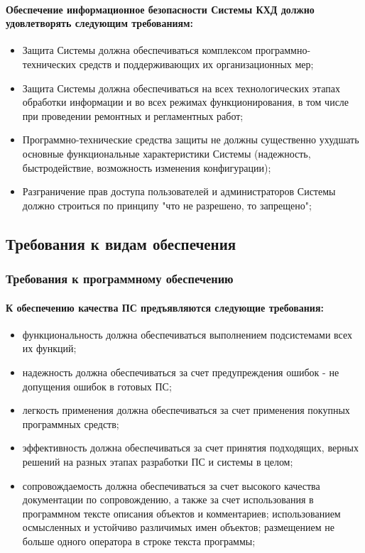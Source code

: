 \documentclass{article}
\begin{document}
            \paragraph{Обеспечение информационное безопасности Системы КХД должно удовлетворять следующим требованиям:}
            \begin{itemize}
                \item Защита Системы должна обеспечиваться комплексом программно-технических средств и поддерживающих их организационных мер;
                \item Защита Системы должна обеспечиваться на всех технологических этапах обработки информации и во всех режимах функционирования, в том числе при проведении ремонтных и регламентных работ;
                \item Программно-технические средства защиты не должны существенно ухудшать основные функциональные характеристики Системы (надежность, быстродействие, возможность изменения конфигурации);
                \item Разграничение прав доступа пользователей и администраторов Системы должно строиться по принципу "что не разрешено, то запрещено";
            \end{itemize}
        
    \newpage
        
    \subsection{Требования к видам обеспечения}
        \subsubsection{Требования к программному обеспечению}
 
            \paragraph{К обеспечению качества ПС предъявляются следующие требования:}
            \begin{itemize}
                \item функциональность должна обеспечиваться выполнением подсистемами всех их функций;
                \item надежность должна обеспечиваться за счет предупреждения ошибок - не допущения ошибок в готовых ПС;
                \item легкость применения должна обеспечиваться за счет применения покупных программных средств;
                \item эффективность должна обеспечиваться за счет принятия подходящих, верных решений на разных этапах разработки ПС и системы в целом;
                \item сопровождаемость должна обеспечиваться за счет высокого качества документации по сопровождению, а также за счет использования в программном тексте описания объектов и комментариев; использованием осмысленных и устойчиво различимых имен объектов; размещением не больше одного оператора в строке текста программы; 
            \end{itemize}
            
\end{document}
